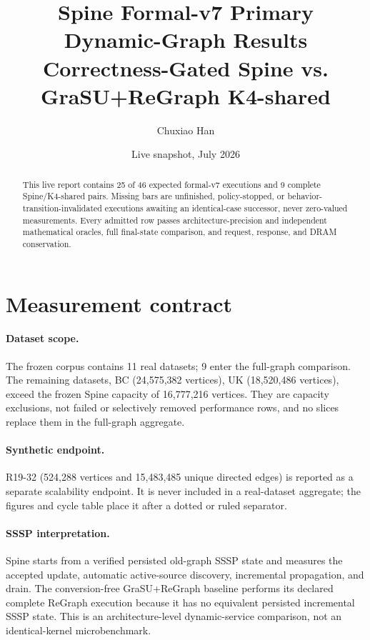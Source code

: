 \documentclass[10pt]{article}
\title{\textbf{Spine Formal-v7 Primary Dynamic-Graph Results}\\
\large Correctness-Gated Spine vs. GraSU+ReGraph K4-shared}
\author{Chuxiao Han}
\date{Live snapshot, July 2026}
\newcommand{\vdatadir}{data/formal_v7_primary}
\newcommand{\vdatadir}{docs/paper/data/formal_v7_primary}
\begin{document}
\maketitle
\begin{abstract}
This live report contains 25 of
46 expected formal-v7 executions and
9 complete Spine/K4-shared pairs. Missing bars are unfinished,
policy-stopped, or behavior-transition-invalidated executions awaiting an
identical-case successor, never zero-valued measurements. Every admitted row
passes architecture-precision and independent mathematical oracles, full
final-state comparison, and request, response, and DRAM conservation.
\end{abstract}

\section{Measurement contract}
\begin{table}[H]
\centering
\small

\caption{Measurement windows observed in admitted formal-v7 rows.}
\end{table}

\paragraph{Dataset scope.}
The frozen corpus contains 11 real datasets;
9 enter the full-graph comparison. The
remaining datasets, BC (24,575,382 vertices), UK (18,520,486 vertices), exceed the frozen Spine capacity of
16,777,216 vertices. They are capacity exclusions,
not failed or selectively removed performance rows, and no slices replace them
in the full-graph aggregate.

\paragraph{Synthetic endpoint.}
R19-32 (524,288 vertices and 15,483,485 unique directed edges) is reported as
a separate scalability endpoint. It is never included in a real-dataset
aggregate; the figures and cycle table place it after a dotted or ruled
separator.

\paragraph{SSSP interpretation.}
Spine starts from a verified persisted old-graph SSSP state and measures the
accepted update, automatic active-source discovery, incremental propagation,
and drain. The conversion-free GraSU+ReGraph baseline performs its declared
complete ReGraph execution because it has no equivalent persisted incremental
SSSP state. This is an architecture-level dynamic-service comparison, not an
identical-kernel microbenchmark.
\end{document}
